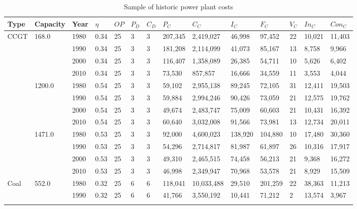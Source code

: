 \begin{table}[]
	\caption{Sample of historic power plant costs \cite{IRENA2018,IEA2015,OWPB2016}} 
	\begin{tabular}{|l|l|l|l|l|l|l|l|l|l|l|l|l|l|}
	\hline
	Type & Capacity & Year & $\eta$ & $OP$ & $P_D$ & $C_D$ & $P_C$ & $C_C$ & $I_C$ & $F_C$ & $V_C$ & $In_C$ & $Con_C$ \\ \hline
	\multirow{12}{*}{CCGT} & \multirow{4}{*}{168.0} & 1980 & 0.34 & 25 & 3 & 3 & 207,345 & 2,419,027 & 46,998 & 97,452 & 22 & 10,021 & 11,403 \\ \cline{3-14} 
	&  & 1990 & 0.34 & 25 & 3 & 3 & 181,208 & 2,114,099 & 41,073 & 85,167 & 13 & 8,758 & 9,966 \\ \cline{3-14} 
	&  & 2000 & 0.34 & 25 & 3 & 3 & 116,407 & 1,358,089 & 26,385 & 54,711 & 10 & 5,626 & 6,402 \\ \cline{3-14} 
	&  & 2010 & 0.34 & 25 & 3 & 3 & 73,530 & 857,857 & 16,666 & 34,559 & 11 & 3,553 & 4,044 \\ \cline{2-14} 
	& \multirow{4}{*}{1200.0} & 1980 & 0.54 & 25 & 3 & 3 & 59,102 & 2,955,138 & 89,245 & 72,105 & 31 & 12,411 & 19,503 \\ \cline{3-14} 
	&  & 1990 & 0.54 & 25 & 3 & 3 & 59,884 & 2,994,246 & 90,426 & 73,059 & 21 & 12,575 & 19,762 \\ \cline{3-14} 
	&  & 2000 & 0.54 & 25 & 3 & 3 & 49,674 & 2,483,747 & 75,009 & 60,603 & 21 & 10,431 & 16,392 \\ \cline{3-14} 
	&  & 2010 & 0.54 & 25 & 3 & 3 & 60,640 & 3,032,008 & 91,566 & 73,981 & 13 & 12,734 & 20,011 \\ \cline{2-14} 
	& \multirow{4}{*}{1471.0} & 1980 & 0.53 & 25 & 3 & 3 & 92,000 & 4,600,023 & 138,920 & 104,880 & 10 & 17,480 & 30,360 \\ \cline{3-14} 
	&  & 1990 & 0.53 & 25 & 3 & 3 & 54,296 & 2,714,817 & 81,987 & 61,897 & 26 & 10,316 & 17,917 \\ \cline{3-14} 
	&  & 2000 & 0.53 & 25 & 3 & 3 & 49,310 & 2,465,515 & 74,458 & 56,213 & 21 & 9,368 & 16,272 \\ \cline{3-14} 
	&  & 2010 & 0.53 & 25 & 3 & 3 & 46,998 & 2,349,947 & 70,968 & 53,578 & 21 & 8,929 & 15,509 \\ \hline
	\multirow{24}{*}{Coal} & \multirow{4}{*}{552.0} & 1980 & 0.32 & 25 & 6 & 6 & 118,041 & 10,033,488 & 29,510 & 201,259 & 22 & 38,363 & 11,213 \\ \cline{3-14} 
	&  & 1990 & 0.32 & 25 & 6 & 6 & 41,766 & 3,550,192 & 10,441 & 71,212 & 2 & 13,574 & 3,967 \\ \cline{3-14} 

\end{tabular}
\end{table}
